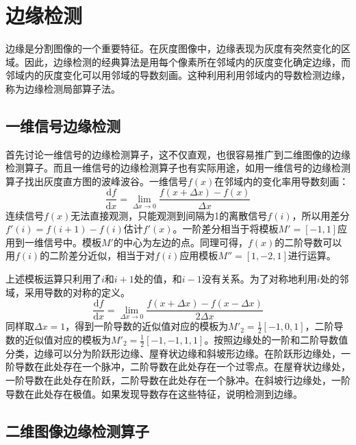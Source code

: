 \section{边缘检测}\label{sec:edge}

边缘是分割图像的一个重要特征。在灰度图像中，边缘表现为灰度有突然变化的区域。因此，边缘检测的经典算法是用每个像素所在邻域内的灰度变化确定边缘，而邻域内的灰度变化可以用邻域的导数刻画。这种利用利用邻域内的导数检测边缘，称为边缘检测局部算子法。

\subsection{一维信号边缘检测}

首先讨论一维信号的边缘检测算子，这不仅直观，也很容易推广到二维图像的边缘检测算子。而且一维信号的边缘检测算子也有实际用途，如用一维信号的边缘检测算子找出灰度直方图的波峰波谷。一维信号$f(x)$在邻域内的变化率用导数刻画：
\begin{equation}
  \label{eq:diff}
  \frac{\mathrm{d}f}{\mathrm{d}x}=\lim_{\Delta x\to 0}\frac{f(x+\Delta x)-f(x)}{\Delta x}
\end{equation}
连续信号$f(x)$无法直接观测，只能观测到间隔为1的离散信号$f(i)$，所以用差分$f'(i)=f(i+1)-f(i)$估计$f'(x)$。一阶差分相当于将模板$M'=[-1,1]$应用到一维信号中。模板$M'$的中心为左边的点。同理可得，$f(x)$的二阶导数可以用$f(i)$的二阶差分近似，相当于对$f(i)$应用模板$M''=[1,-2,1]$进行运算。

上述模板运算只利用了$i$和$i+1$处的值，和$i-1$没有关系。为了对称地利用$i$处的邻域，采用导数的对称的定义。
\begin{equation}
  \label{eq:diff2}
  \frac{\mathrm{d}f}{\mathrm{d}x}=\lim_{\Delta x\to 0}\frac{f(x+\Delta x)-f(x-\Delta x)}{2\Delta x}
\end{equation}
同样取$\Delta x=1$，得到一阶导数的近似值对应的模板为$M'_2=\frac{1}{2}[-1,0,1]$，二阶导数的近似值对应的模板为$M'_2=\frac{1}{2}[-1,-1,1,1]$。按照边缘处的一阶和二阶导数值分类，边缘可以分为阶跃形边缘、屋脊状边缘和斜坡形边缘。在阶跃形边缘处，一阶导数在此处存在一个脉冲，二阶导数在此处存在一个过零点。在屋脊状边缘处，一阶导数在此处存在阶跃，二阶导数在此处存在一个脉冲。在斜坡行边缘处，一阶导数在此处存在极值。如果发现导数存在这些特征，说明检测到边缘。

\subsection{二维图像边缘检测算子}

